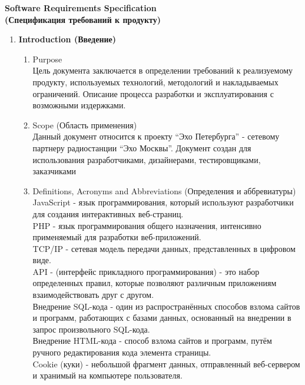 \thispagestyle{empty}
\BgThispage
\begin{center}
    \LARGE
    \textbf{Software Requirements Specification \\
    (Спецификация требований к продукту)} \\
    \normalsize
\end{center}

\begin{enumerate}
    \item \textbf{Introduction (Введение)}
    \begin{enumerate}[label=1.\arabic*]
        \item Purpose \\
        Цель документа заключается в определении требований к реализуемому продукту, используемых технологий,
        методологий и накладываемых ограничений. Описание процесса разработки и эксплуатирования с возможными издержками.
        \item Scope (Область применения) \\
        Данный документ относится к проекту ``Эхо Петербурга'' - сетевому партнеру радиостанции ``Эхо Москвы''. Документ
        создан для использования разработчиками, дизайнерами, тестировщиками, заказчиками
        \item Definitions, Acronyms and Abbreviations (Определения и аббревиатуры) \\
        JavaScript - язык программирования, который используют разработчики для создания интерактивных веб-страниц. \\
        PHP - язык программирования общего назначения, интенсивно применяемый для разработки веб-приложений. \\
        TCP/IP - сетевая модель передачи данных, представленных в цифровом виде. \\
        API - (интерфейс прикладного программирования) - это набор определенных правил, которые позволяют различным приложениям взаимодействовать друг с другом. \\
        Внедрение SQL-кода - один из распространённых способов взлома сайтов и программ, работающих с базами данных, основанный на внедрении в запрос произвольного SQL-кода. \\
        Внедрение HTML-кода - способ взлома сайтов и программ, путём ручного редактирования кода элемента страницы. \\
        Cookie (куки) - небольшой фрагмент данных, отправленный веб-сервером и хранимый на компьютере пользователя.\\

\end{enumerate}
\end{enumerate}
